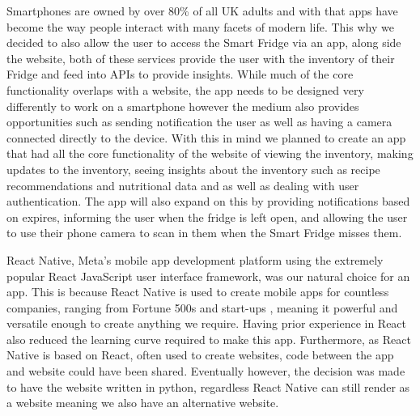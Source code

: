 Smartphones are owned by over 80\% \cite{stat} of all UK adults and with that apps have become the way people interact with many facets of modern life.
This why we decided to also allow the user to access the Smart Fridge via an app, along side the website, both of these services provide the user with the inventory of their Fridge and feed into APIs to provide insights.
While much of the core functionality overlaps with a website, the app needs to be designed very differently to work on a smartphone however the medium also provides opportunities such as sending notification the user as well as having a camera connected directly to the device.
With this in mind we planned to create an app that had all the core functionality of the website of viewing the inventory, making updates to the inventory, seeing insights about the inventory such as recipe recommendations and nutritional data and as well as dealing with user authentication.
The app will also expand on this by providing notifications based on expires, informing the user when the fridge is left open, and allowing the user to use their phone camera to scan in them when the Smart Fridge misses them.

React Native, Meta's mobile app development platform using the extremely popular React JavaScript user interface framework, was our natural choice for an app.
This is because React Native is used to create mobile apps for countless companies, ranging from Fortune 500s and start-ups \cite{react}, meaning it powerful and versatile enough to create anything we require.
Having prior experience in React also reduced the learning curve required to make this app.
Furthermore, as React Native is based on React, often used to create websites, code between the app and website could have been shared.
Eventually however, the decision was made to have the website written in python, regardless React Native can still render as a website meaning we also have an alternative website.

